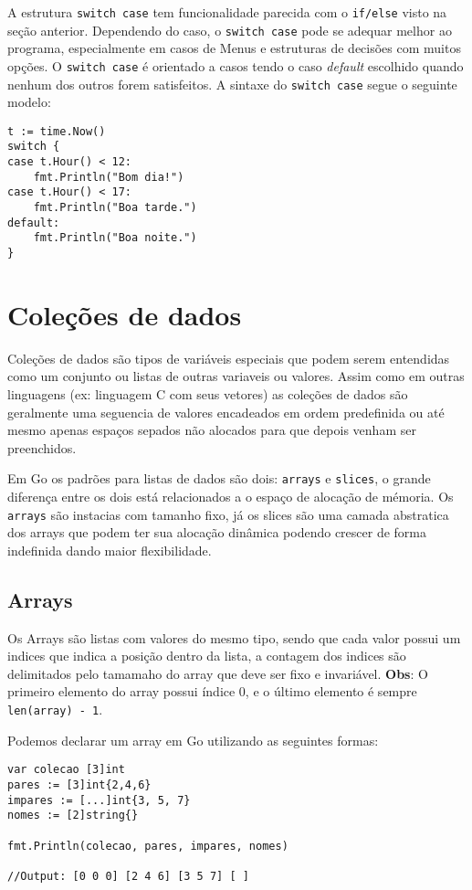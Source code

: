 \documentclass{SBCbookchapter}
\begin{document}
A estrutura \texttt{switch case} tem funcionalidade parecida com o \texttt{if/else} visto na seção anterior. Dependendo do caso, o \texttt{switch case} pode se adequar melhor ao programa, especialmente em casos de Menus e estruturas de decisões com muitos opções. O \texttt{switch case} é orientado a casos tendo o caso \textit{default} escolhido quando nenhum dos outros forem satisfeitos. A sintaxe do \texttt{switch case} segue o seguinte modelo:

\begin{lstlisting}
t := time.Now()
switch {
case t.Hour() < 12:
	fmt.Println("Bom dia!")
case t.Hour() < 17:
	fmt.Println("Boa tarde.")
default:
	fmt.Println("Boa noite.")
}
\end{lstlisting}

\section{Coleções de dados}

Coleções de dados são tipos de variáveis especiais que podem serem entendidas como um conjunto ou listas de outras variaveis ou valores. Assim como em outras linguagens (ex: linguagem C com seus vetores) as coleções de dados são geralmente uma seguencia de valores encadeados em ordem predefinida ou até mesmo apenas espaços sepados não alocados para que depois venham ser preenchidos.


Em Go os padrões para listas de dados são dois: \texttt{arrays} e \texttt{slices}, o grande diferença entre os dois está relacionados a o espaço de alocação de mémoria. Os \texttt{arrays} são instacias com tamanho fixo, já os slices são uma camada abstratica dos arrays que podem ter sua alocação dinâmica podendo crescer de forma indefinida dando maior flexibilidade.

\subsection{Arrays}

Os Arrays são listas com valores do mesmo tipo, sendo que cada valor possui um indices que indica a posição dentro da lista, a contagem dos indices são delimitados pelo tamamaho do array que deve ser fixo e invariável. \textbf{Obs}: O primeiro elemento do array possui índice 0, e o último elemento é sempre \texttt{len(array) - 1}.


Podemos declarar um array em Go utilizando as seguintes formas:

\begin{lstlisting}
var colecao [3]int
pares := [3]int{2,4,6}
impares := [...]int{3, 5, 7}
nomes := [2]string{}

fmt.Println(colecao, pares, impares, nomes)

//Output: [0 0 0] [2 4 6] [3 5 7] [ ]
\end{lstlisting}
\end{document}
